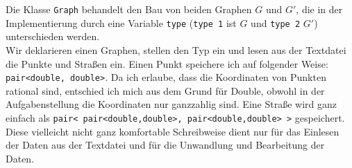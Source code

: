 \documentclass[a4paper,10pt,ngerman]{scrartcl}
\begin{document}
Die Klasse \texttt{Graph} behandelt den Bau von beiden Graphen $G$ und $G'$, die in der Implementierung durch
eine Variable \texttt{type} (\texttt{type 1} ist $G$ und \texttt{type 2} $G'$) unterschieden werden.\\
Wir deklarieren einen Graphen, stellen den Typ ein und lesen aus der Textdatei die Punkte und Straßen ein.
Einen Punkt speichere ich auf folgender Weise: \texttt{pair<double, double>}. Da ich erlaube, dass
die Koordinaten von Punkten rational sind, entschied ich mich aus dem Grund für Double,
obwohl in der Aufgabenstellung die Koordinaten nur ganzzahlig sind.
Eine Straße wird ganz einfach als \texttt{pair< pair<double,double>, pair<double,double> >} gespeichert. 
Diese vielleicht nicht ganz komfortable Schreibweise dient nur für das Einlesen der Daten aus der Textdatei
und für die Unwandlung und Bearbeitung der Daten.\\
\end{document}
